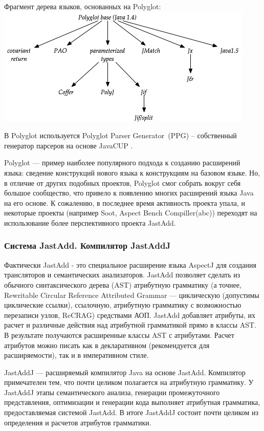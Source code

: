\documentclass[a4paper,12pt]{article}
\begin{document}
\begin{center}
Фрагмент дерева языков, основанных на Polyglot:
\nopagebreak
 \includegraphics[scale=0.6]{img/polyglot-tree.png}
\end{center}

В Polyglot используется Polyglot Parser Generator~(PPG) -- собственный генератор
парсеров на основе JavaCUP \cite{javacup}.

Polyglot --- пример наиболее популярного подхода к созданию расширений языка:
сведение конструкций нового языка к конструкциям на базовом языке. Но, в
отличие от других подобных проектов, Polyglot смог собрать вокруг себя большое
сообщество, что привело к появлению многих расширений языка Java на его основе.
К сожалению, в последнее время активность проекта упала, и некоторые проекты
(например Soot, Aspect Bench Compiller(abc)) переходят на использование более
перспективного проекта JastAdd.

\subsubsection*{Система JastAdd. Компилятор JastAddJ}
Фактически JastAdd - это специальное расширение языка AspectJ для создания
трансляторов и семантических анализаторов. JastAdd позволяет сделать из
обычного синтаксического дерева (AST) атрибутную грамматику (а точнее, 
Rewritable Circular Reference Attributed Grammar --- циклическую (допустимы
циклические ссылки), ссылочную, атрибутную грамматику с возможностью
перезаписи узлов, ReCRAG) средствами АОП. JastAdd добавляет атрибуты, их расчет
и различные действия над атрибутной грамматикой прямо в классы AST. В
результате получаются расширенные классы AST с атрибутами. Расчет атрибутов
можно писать как в декларативном (рекомендуется для расширяемости), так и в
императивном стиле.

JastAddJ --- расширяемый компилятор Java на основе JastAdd. Компилятор
примечателен тем, что почти целиком полагается на атрибутную грамматику. У
JastAddJ этапы семантического анализа, генерации промежуточного представления,
оптимизации и генерации кода выполняет атрибутная грамматика, предоставляемая
системой JastAdd. В итоге JastAddJ состоит почти целиком из определения и
расчетов атрибутов грамматики.
\end{document}
